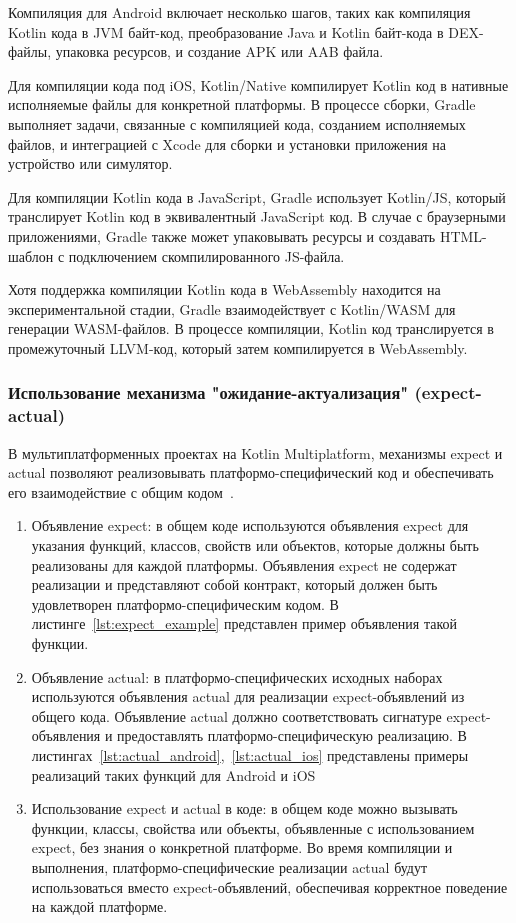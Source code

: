 \documentclass[14pt, russian]{scrartcl}
\begin{document}
Компиляция для Android включает несколько шагов, таких как компиляция Kotlin кода в JVM байт-код, преобразование Java и Kotlin байт-кода в DEX-файлы, упаковка ресурсов, и создание APK или AAB файла.	
    	
Для компиляции кода под iOS, Kotlin/Native компилирует Kotlin код в нативные исполняемые файлы для конкретной платформы. В процессе сборки, Gradle выполняет задачи, связанные с компиляцией кода, созданием исполняемых файлов, и интеграцией с Xcode для сборки и установки приложения на устройство или симулятор.	

Для компиляции Kotlin кода в JavaScript, Gradle использует Kotlin/JS, который транслирует Kotlin код в эквивалентный JavaScript код. В случае с браузерными приложениями, Gradle также может упаковывать ресурсы и создавать HTML-шаблон с подключением скомпилированного JS-файла.	

Хотя поддержка компиляции Kotlin кода в WebAssembly находится на экспериментальной стадии, Gradle взаимодействует с Kotlin/WASM для генерации WASM-файлов. В процессе компиляции, Kotlin код транслируется в промежуточный LLVM-код, который затем компилируется в WebAssembly.

\subsubsection{Использование механизма "ожидание-актуализация"{} (expect-actual)}\label{sect:expect-actual}

В мультиплатформенных проектах на Kotlin Multiplatform, механизмы expect и actual позволяют реализовывать платформо-специфический код и обеспечивать его взаимодействие с общим кодом~\cite{KotlinExpectActual}.

\begin{enumerate}
    \item Объявление expect: в общем коде используются объявления expect для указания функций, классов, свойств или объектов, которые должны быть реализованы для каждой платформы. Объявления expect не содержат реализации и представляют собой контракт, который должен быть удовлетворен платформо-специфическим кодом. В листинге~\ref{lst:expect_example} представлен пример объявления такой функции.
    
    \item Объявление actual: в платформо-специфических исходных наборах используются объявления actual для реализации expect-объявлений из общего кода. Объявление actual должно соответствовать сигнатуре expect-объявления и предоставлять платформо-специфическую реализацию. В листингах~\ref{lst:actual_android},~\ref{lst:actual_ios} представлены примеры реализаций таких функций для Android и iOS

    \item Использование expect и actual в коде: в общем коде можно вызывать функции, классы, свойства или объекты, объявленные с использованием expect, без знания о конкретной платформе. Во время компиляции и выполнения, платформо-специфические реализации actual будут использоваться вместо expect-объявлений, обеспечивая корректное поведение на каждой платформе.
    
\end{enumerate}
\end{document}
